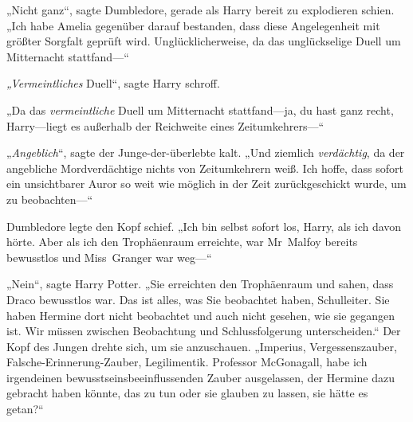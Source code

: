 „Nicht ganz“, sagte Dumbledore, gerade als Harry bereit zu explodieren schien.
„Ich habe Amelia gegenüber darauf bestanden, dass diese Angelegenheit mit größter Sorgfalt geprüft wird. Unglücklicherweise, da das unglückselige Duell um Mitternacht stattfand—“

\emph{„Vermeintliches} Duell“, sagte Harry schroff.

„Da das \emph{vermeintliche} Duell um Mitternacht stattfand—ja, du hast ganz recht, Harry—liegt es außerhalb der Reichweite eines Zeitumkehrers—“

„\emph{Angeblich}“, sagte der Junge-der-überlebte kalt.
„Und ziemlich \emph{verdächtig}, da der angebliche Mordverdächtige nichts von Zeitumkehrern weiß. Ich hoffe, dass sofort ein unsichtbarer Auror so weit wie möglich in der Zeit zurückgeschickt wurde, um zu beobachten—“

Dumbledore legte den Kopf schief.
„Ich bin selbst sofort los, Harry, als ich davon hörte. Aber als ich den Trophäenraum erreichte, war Mr~Malfoy bereits bewusstlos und Miss~Granger war weg—“

„Nein“, sagte Harry Potter.
„Sie erreichten den Trophäenraum und sahen, dass Draco bewusstlos war. Das ist alles, was Sie beobachtet haben, Schulleiter. Sie haben Hermine dort nicht beobachtet und auch nicht gesehen, wie sie gegangen ist. Wir müssen zwischen Beobachtung und Schlussfolgerung unterscheiden.“ Der Kopf des Jungen drehte sich, um sie anzuschauen.
„Imperius, Vergessenszauber, Falsche-Erinnerung-Zauber, Legilimentik. Professor McGonagall, habe ich irgendeinen bewusstseinsbeeinflussenden Zauber ausgelassen, der Hermine dazu gebracht haben könnte, das zu tun oder sie glauben zu lassen, sie hätte es getan?“

